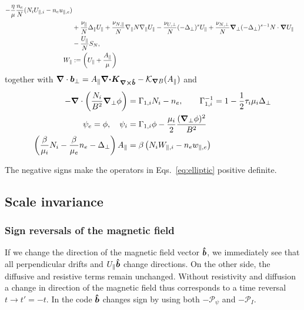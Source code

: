\begin{subequations}
\begin{align}
        - \frac{\eta}{\mu} \frac{n_e}{N}(N_iU_{\parallel,i} - n_eu_{\parallel,e})
\nonumber \\&
\vphantom{\frac{\vec b\times\vn \psi}{B}} %
        + \frac{\nu_\parallel}{N} \Delta_\parallel U_\parallel
        + \frac{\nu_{N,\parallel}}{N} \npar N \npar U_\parallel
        - \frac{\nu_{U,\perp}}{N}(-\Delta_\perp)^{s} U_\parallel
        + \frac{\nu_{N,\perp}}{N} \np (-\Delta_\perp)^{s-1} N \cn U_\parallel
\nonumber \\&
    - \frac{U_\parallel}{N} S_N
    ,
        \label{eq:EgyrofluidU} \\
        W_\parallel&:= \left( U_\parallel + \frac{A_\parallel}{\mu}\right)
    \end{align}
    \label{eq:Egyrofluid}
\end{subequations}
together with
${\boldsymbol{\nabla}}\cdot { {\boldsymbol{b}}}_\perp = A_\parallel {\boldsymbol{{\boldsymbol{\nabla}}\cdot}}{\boldsymbol{ { K}_{{\boldsymbol{\nabla}}\times\bm{\hat{b}}}}} - \mathcal K_{{\boldsymbol{\nabla}} B}(A_\parallel) $
and
\begin{subequations} \label{eq:elliptic}
  \begin{align}
    -{\boldsymbol{\nabla}}\cdot\left( \frac{N_i}{B^2}{\boldsymbol{\nabla}}_{\perp} \phi \right) &= \Gamma_{1,i} N_i - n_e, \quad\quad
    \Gamma_{1,i}^{-1} = 1-\frac{1}{2}\tau_i\mu_i \Delta_\perp \\
    \psi_e = \phi, \quad \psi_i &= \Gamma_{1,i}\phi -\frac{\mu_i}{2}\frac{({\boldsymbol{\nabla}}_{\perp}\phi)^2}{B^2} \\
    \left(\frac{\beta}{\mu_i}N_i - \frac{\beta}{\mu_e}n_e-\Delta_\perp\right)
    A_\parallel &= \beta\left(N_iW_{\parallel,i}-n_e w_{\parallel,e}\right)
  \end{align}
\end{subequations}
\begin{tcolorbox}[title=Note]
The negative signs make the operators in Eqs.~\eqref{eq:elliptic} positive definite.
\end{tcolorbox}

\subsection{Scale invariance}
\subsubsection{Sign reversals of the magnetic field}\label{sec:field_reversal}
If we change the direction of the magnetic field vector $\bm{\hat{b}}$, we immediately see that all perpendicular
drifts and $U_\parallel\bm{\hat{b}}$ change directions. On the other side, the diffusive and resistive terms remain unchanged.
Without resistivity and diffusion a change in direction of the magnetic field thus corresponds to
a time reversal $t\rightarrow t'=-t$.
In the code $\bm{\hat{b}}$ changes sign by using both $-\mathcal P_\psi$ and $-\mathcal P_I$.

